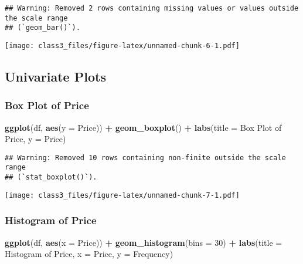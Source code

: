 \documentclass[
]{article}
\newenvironment{Shaded}{\begin{snugshade}}{\end{snugshade}}
\newcommand{\AttributeTok}[1]{\textcolor[rgb]{0.13,0.29,0.53}{#1}}
\newcommand{\DecValTok}[1]{\textcolor[rgb]{0.00,0.00,0.81}{#1}}
\newcommand{\FunctionTok}[1]{\textcolor[rgb]{0.13,0.29,0.53}{\textbf{#1}}}
\newcommand{\NormalTok}[1]{#1}
\newcommand{\SpecialCharTok}[1]{\textcolor[rgb]{0.81,0.36,0.00}{\textbf{#1}}}
\newcommand{\StringTok}[1]{\textcolor[rgb]{0.31,0.60,0.02}{#1}}
\begin{document}
\begin{verbatim}
## Warning: Removed 2 rows containing missing values or values outside the scale range
## (`geom_bar()`).
\end{verbatim}

\texttt{[image: class3\_files/figure-latex/unnamed-chunk-6-1.pdf]}

\subsection{Univariate Plots}\label{univariate-plots}

\subsubsection{Box Plot of Price}\label{box-plot-of-price}

\begin{Shaded}
\begin{Highlighting}[]
\FunctionTok{ggplot}\NormalTok{(df, }\FunctionTok{aes}\NormalTok{(}\AttributeTok{y =}\NormalTok{ Price)) }\SpecialCharTok{+}
  \FunctionTok{geom\_boxplot}\NormalTok{() }\SpecialCharTok{+}
  \FunctionTok{labs}\NormalTok{(}\AttributeTok{title =} \StringTok{\textquotesingle{}Box Plot of Price\textquotesingle{}}\NormalTok{, }\AttributeTok{y =} \StringTok{\textquotesingle{}Price\textquotesingle{}}\NormalTok{)}
\end{Highlighting}
\end{Shaded}

\begin{verbatim}
## Warning: Removed 10 rows containing non-finite outside the scale range
## (`stat_boxplot()`).
\end{verbatim}

\texttt{[image: class3\_files/figure-latex/unnamed-chunk-7-1.pdf]}

\subsubsection{Histogram of Price}\label{histogram-of-price}

\begin{Shaded}
\begin{Highlighting}[]
\FunctionTok{ggplot}\NormalTok{(df, }\FunctionTok{aes}\NormalTok{(}\AttributeTok{x =}\NormalTok{ Price)) }\SpecialCharTok{+}
  \FunctionTok{geom\_histogram}\NormalTok{(}\AttributeTok{bins =} \DecValTok{30}\NormalTok{) }\SpecialCharTok{+}
  \FunctionTok{labs}\NormalTok{(}\AttributeTok{title =} \StringTok{\textquotesingle{}Histogram of Price\textquotesingle{}}\NormalTok{, }\AttributeTok{x =} \StringTok{\textquotesingle{}Price\textquotesingle{}}\NormalTok{, }\AttributeTok{y =} \StringTok{\textquotesingle{}Frequency\textquotesingle{}}\NormalTok{)}
\end{Highlighting}
\end{Shaded}
\end{document}

